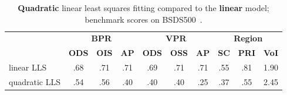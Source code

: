 \begin{table}[htbp]
\renewcommand{\arraystretch}{1.3}
\centering
\scriptsize
\begin{tabular}{l|c|c|c||c|c|c||c|c|c|}
\cline{2-10} %
\multirow{2}{*}{} & \multicolumn{3}{c||}{\textbf{BPR}} & \multicolumn{3}{c||}{\textbf{VPR}}& \multicolumn{3}{c|}{\textbf{Region}}\\
\cline{2-10}
& \textbf{ODS}  & \textbf{OIS} & \textbf{AP} %
& \textbf{ODS} & \textbf{OSS} & \textbf{AP} %
& \textbf{SC} & \textbf{PRI} & \textbf{VoI} \\
\hline
\multicolumn{1}{|l|}{linear LLS} & .68 & .71 & .71 & .69 & .71 & .71 & .55 & .81 & 1.90 \\%
\hline
\multicolumn{1}{|l|}{quadratic LLS} & .54 & .56 & .40 & .40 & .40 & .25 & .37 & .55 & 2.45 \\
\hline
\end{tabular}
\caption[{\bf Quadratic} LLS fitting compared to the {\bf linear} model - table]{{\bf Quadratic} linear least squares fitting compared to the {\bf linear} model; benchmark scores on BSDS500~\cite{BSDS500resources}.}
\label{tab:quadratic-lls-fitting}
\end{table}

